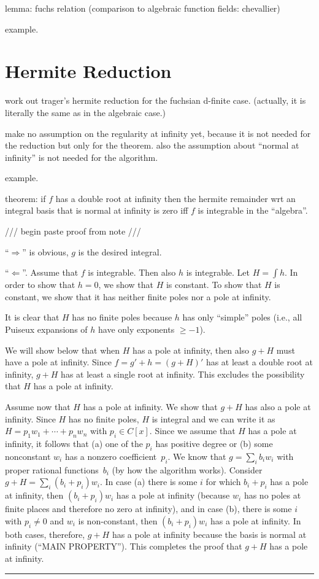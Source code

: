 \documentclass{sig-alternate}
\begin{document}
lemma: fuchs relation (comparison to algebraic function fields: chevallier)

example. 

\section{Hermite Reduction}

work out trager's hermite reduction for the fuchsian d-finite case. (actually, it is
literally the same as in the algebraic case.)

make no assumption on the regularity at infinity yet, because it is not needed for the
reduction but only for the theorem. also the assumption about ``normal at infinity'' is
not needed for the algorithm.

example. 

theorem: if $f$ has a double root at infinity then the hermite remainder wrt an integral
basis that is normal at infinity is zero iff $f$ is integrable in the ``algebra''.

/// begin paste proof from note ///

``$\Rightarrow$'' is obvious, $g$ is the desired integral.

``$\Leftarrow$''. Assume that $f$ is integrable. Then also $h$ is integrable.
Let $H=\int h$.
In order to show that $h=0$, we show that $H$ is constant.
To show that $H$ is constant, we show that it has neither finite poles nor a pole at infinity.

It is clear that $H$ has no finite poles because $h$ has only ``simple'' poles (i.e., all Puiseux
expansions of $h$ have only exponents $\geq-1$).

We will show below that when $H$ has a pole at infinity, then also $g+H$ must have a pole at infinity.
Since $f=g'+h=(g+H)'$ has at least a double root at infinity, $g+H$ has at least
a single root at infinity. This excludes the possibility that $H$ has a pole at infinity.

Assume now that $H$ has a pole at infinity. We show that $g+H$ has also a pole at infinity. 
Since $H$ has no finite poles, $H$ is integral and we can write it as
$H=p_1w_1+\cdots+p_nw_n$ with $p_i\in C[x]$.
Since we assume that $H$ has a pole at infinity, it follows that (a) one of the $p_i$ has positive degree
or (b) some nonconstant $w_i$ has a nonzero coefficient~$p_i$.
We know that $g=\sum_i b_iw_i$ with proper rational functions~$b_i$ (by how the algorithm works).
Consider $g+H=\sum_i (b_i+p_i)w_i$.
In case (a) there is some $i$ for which $b_i+p_i$ has a pole at infinity, then $(b_i+p_i)w_i$ has a pole
at infinity (because $w_i$ has no poles at finite places and therefore no zero at infinity),
and in case (b), there is some $i$ with $p_i\neq 0$ and $w_i$ is non-constant, then $(b_i+p_i)w_i$ has a
pole at infinity.
In both cases, therefore, $g+H$ has a pole at infinity because the basis is normal
at infinity (``MAIN PROPERTY'').
This completes the proof that $g+H$ has a pole at infinity. \rule{1ex}{1ex}
\end{document}
